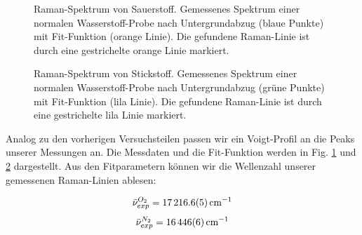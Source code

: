 \documentclass[11pt]{article}
\begin{document}
\begin{figure}[htbp]
	\centering
   \caption{\small Raman-Spektrum von Sauerstoff. Gemessenes Spektrum einer normalen Wasserstoff-Probe nach Untergrundabzug (blaue Punkte) mit Fit-Funktion (orange Linie). Die gefundene Raman-Linie ist durch eine gestrichelte orange Linie markiert.}
   \label{fig:O2}
\end{figure}

\begin{figure}[htbp]
	\centering
   \caption{\small Raman-Spektrum von Stickstoff. Gemessenes Spektrum einer normalen Wasserstoff-Probe nach Untergrundabzug (grüne Punkte) mit Fit-Funktion (lila Linie). Die gefundene Raman-Linie ist durch eine gestrichelte lila Linie markiert.}
   \label{fig:N2}
\end{figure}

Analog zu den vorherigen Versuchsteilen passen wir ein Voigt-Profil an die Peaks unserer Messungen an. Die Messdaten und die Fit-Funktion werden in Fig. \ref{fig:O2} und \ref{fig:N2} dargestellt. Aus den Fitparametern können wir die Wellenzahl unserer gemessenen Raman-Linien ablesen:

$$\bar{\nu}^{O_2}_{exp} = \SI{17216.6\pm 0.5}{cm^{-1}}$$
$$\bar{\nu}^{N_2}_{exp} = \SI{16446\pm 6}{cm^{-1}}$$
\end{document}
